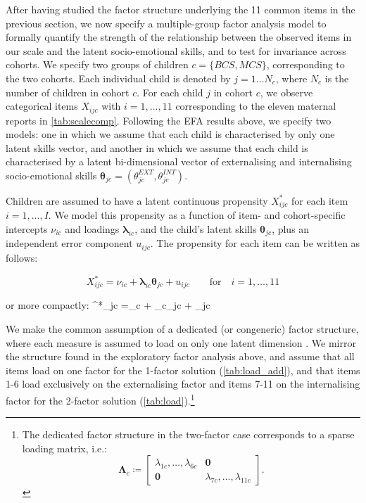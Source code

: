 After having studied the factor structure underlying the 11 common items in the previous section, we now specify a multiple-group factor analysis model to formally quantify the strength of the relationship between the observed items in our scale and the latent socio-emotional skills, and to test for invariance across cohorts. We specify two groups of children $c=\{BCS,MCS\}$, corresponding to the two cohorts. Each individual child is denoted by $j=1\dots N_c$, where $N_c$ is the number of children in cohort $c$. For each child $j$ in cohort $c$, we observe categorical items $X_{ijc}$ with $i=1,\dots,11$ corresponding to the eleven maternal reports in \autoref{tab:scalecomp}. Following the EFA results above, we specify two models: one in which we assume that each child is characterised by only one latent skills vector, and another in which we assume that each child is characterised by a latent bi-dimensional vector of externalising and internalising socio-emotional skills $\bm{\theta}_{jc} = (\theta_{jc}^{EXT},\theta_{jc}^{INT})$.

Children are assumed to have a latent continuous propensity $X^*_{ijc}$ for each item $i=1,\dots,I$. We model this propensity as a function of item- and cohort-specific intercepts $\nu_{ic}$ and loadings $\bm{\lambda}_{ic}$, and the child's latent skills $\bm{\theta}_{jc}$, plus an independent error component $u_{ijc}$. The propensity for each item can be written as follows:

$$X^*_{ijc} =\nu_{ic} + \bm{\lambda}_{ic}\bm{\theta}_{jc} + u_{ijc} \qquad \text{for} \quad i = 1,\dots,11$$

or more compactly:
\be\label{eq:propens}
^*_{jc} =\bm{\nu}_c + \bm{\Lambda}_{c}\bm{\theta}_{jc} + _{jc}
\ee

We make the common assumption of a dedicated (or congeneric) factor structure, where each measure is assumed to load on only one latent dimension \citep{Heckman2013,Conti2010a,Attanasio2018a}. We mirror the structure found in the exploratory factor analysis above, and assume that all items load on one factor for the 1-factor solution (\autoref{tab:load_add}), and that items 1-6 load exclusively on the externalising factor and items 7-11 on the internalising factor for the 2-factor solution (\autoref{tab:load}).\footnote{The dedicated factor structure in the two-factor case corresponds to a sparse loading matrix, i.e.: $$\bm{\Lambda}_{c} \coloneqq \begin{bmatrix} \lambda_{1c}, \dots, \lambda_{6c} & \bm{0} \\ \bm{0} & \lambda_{7c}, \dots, \lambda_{11c} \end{bmatrix}.$$} 

